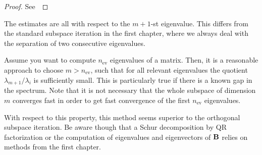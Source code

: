 \begin{proof}
  See~\cite[Theorem 5.2]{Saad11}
\end{proof}

\begin{remark}
  The estimates are all with respect to the $m+1$-st eigenvalue. This
  differs from the standard subspace iteration in the first chapter,
  where we always deal with the separation of two consecutive
  eigenvalues.

  Assume you want to compute $n_{\text{ev}}$ eigenvalues of a matrix.
  Then, it is a reasonable approach to choose $m > n_{\text{ev}}$,
  such that for all relevant eigenvalues the quotient
  $\lambda_{m+1}/\lambda_i$ is sufficiently small. This is
  particularly true if there is a known gap in the spectrum. Note that
  it is not necessary that the whole subspace of dimension $m$
  converges fast in order to get fast convergence of the first
  $n_{\text{ev}}$ eigenvalues.

  With respect to this property, this method seems superior to the
  orthogonal subspace iteration. Be aware though that a Schur
  decomposition by QR factorization or the computation of eigenvalues
  and eigenvectors of $\mathbf B$ relies on methods from the first
  chapter.
\end{remark}



